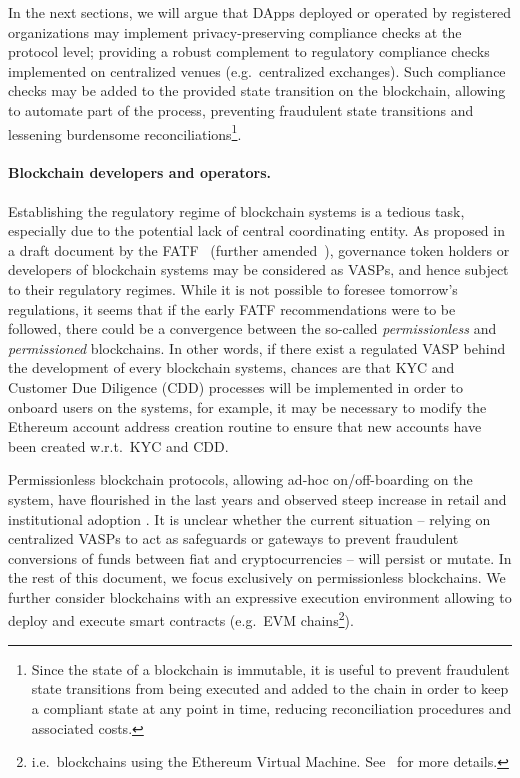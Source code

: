 \documentclass[runningheads,10pt]{llncs}
\numberwithin{equation}{section}
\begin{document}
In the next sections, we will argue that DApps deployed or operated by registered
organizations may implement privacy-preserving compliance checks at the protocol
level; providing a robust complement to regulatory compliance checks implemented
on centralized venues (e.g.~centralized exchanges).  Such compliance checks may
be added to the provided state transition on the blockchain, allowing to
automate part of the process, preventing fraudulent state transitions and
lessening burdensome reconciliations\footnote{Since the state of a blockchain is
  immutable, it is useful to prevent fraudulent state transitions from being
  executed and added to the chain in order to keep a compliant state at any
  point in time, reducing reconciliation procedures and associated costs.}.

\paragraph{Blockchain developers and operators.} Establishing the regulatory regime
of blockchain systems is a tedious task, especially due to the potential lack of
central coordinating entity. As proposed in a draft document by the
FATF~\cite{fatf-va-sixth-draft} (further amended~\cite{fatf-vasp-updated}), governance token holders or developers of blockchain
systems may be considered as VASPs, and hence subject to their regulatory
regimes. While it is not possible to foresee tomorrow's regulations, it seems that if
the early FATF recommendations were to be followed, there could be a convergence between
the so-called \emph{permissionless} and \emph{permissioned} blockchains. In other
words, if there exist a regulated VASP behind the development of every blockchain
systems, chances are that KYC and Customer Due Diligence (CDD) processes will be
implemented in order to onboard users on the systems, for example, it may be
necessary to modify the Ethereum account address creation routine to ensure that new
accounts have been created w.r.t.~KYC and CDD.

Permissionless blockchain protocols, allowing ad-hoc on/off-boarding on the system, have flourished
in the last years and observed steep increase in retail and institutional adoption
\cite{eib-bond-ethereum,occ-blockchain}. It is unclear whether the current
situation -- relying on centralized VASPs to act as safeguards or gateways to prevent
fraudulent conversions of funds between fiat and cryptocurrencies -- will persist or
mutate. In the rest of this document, we focus exclusively on permissionless
blockchains. We further consider blockchains with an expressive execution environment
allowing to deploy and execute smart contracts (e.g.~EVM
chains\footnote{i.e.~blockchains using the Ethereum Virtual Machine.
  See~\cite{eth-docs-evm} for more details.}).
\end{document}
